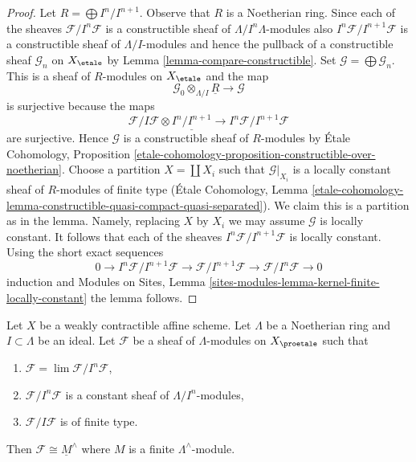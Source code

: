 \begin{proof}
Let $R = \bigoplus I^n/I^{n + 1}$. Observe that $R$ is a Noetherian ring.
Since each of the sheaves
$\mathcal{F}/I^n\mathcal{F}$ is a constructible sheaf of
$\Lambda/I^n\Lambda$-modules also $I^n\mathcal{F}/I^{n + 1}\mathcal{F}$
is a constructible sheaf of $\Lambda/I$-modules and hence the pullback
of a constructible sheaf $\mathcal{G}_n$ on $X_\etale$ by
Lemma \ref{lemma-compare-constructible}.
Set $\mathcal{G} = \bigoplus \mathcal{G}_n$. This is a sheaf
of $R$-modules on $X_\etale$ and the map
$$
\mathcal{G}_0 \otimes_{\Lambda/I} \underline{R}
\longrightarrow
\mathcal{G}
$$
is surjective because the maps
$$
\mathcal{F}/I\mathcal{F} \otimes \underline{I^n/I^{n + 1}} \to
I^n\mathcal{F}/I^{n + 1}\mathcal{F}
$$
are surjective. Hence $\mathcal{G}$ is a constructible sheaf of
$R$-modules by \'Etale Cohomology, Proposition
\ref{etale-cohomology-proposition-constructible-over-noetherian}.
Choose a partition $X = \coprod X_i$ such that
$\mathcal{G}|_{X_i}$ is a locally constant sheaf of $R$-modules
of finite type (\'Etale Cohomology, Lemma
\ref{etale-cohomology-lemma-constructible-quasi-compact-quasi-separated}).
We claim this is a partition as in the lemma.
Namely, replacing $X$ by $X_i$ we may assume $\mathcal{G}$ is locally
constant. It follows that each of the sheaves
 $I^n\mathcal{F}/I^{n + 1}\mathcal{F}$
is locally constant. Using the short exact sequences
$$
0 \to I^n\mathcal{F}/I^{n + 1}\mathcal{F} \to
\mathcal{F}/I^{n + 1}\mathcal{F} \to \mathcal{F}/I^n\mathcal{F} \to 0
$$
induction and Modules on Sites, Lemma
\ref{sites-modules-lemma-kernel-finite-locally-constant}
the lemma follows.
\end{proof}

\begin{lemma}
\label{lemma-weird}
Let $X$ be a weakly contractible affine scheme. Let $\Lambda$ be a Noetherian
ring and $I \subset \Lambda$ be an ideal. Let $\mathcal{F}$ be a sheaf of
$\Lambda$-modules on $X_\proetale$ such that
\begin{enumerate}
\item $\mathcal{F} = \lim \mathcal{F}/I^n\mathcal{F}$,
\item $\mathcal{F}/I^n\mathcal{F}$ is a constant sheaf of
$\Lambda/I^n$-modules,
\item $\mathcal{F}/I\mathcal{F}$ is of finite type.
\end{enumerate}
Then $\mathcal{F} \cong \underline{M}^\wedge$ where $M$ is
a finite $\Lambda^\wedge$-module.
\end{lemma}

